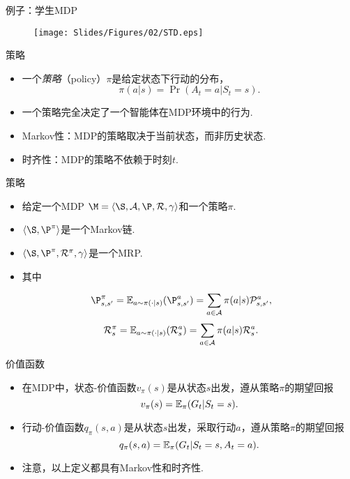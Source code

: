 \begin{frame}{例子：学生MDP}
\begin{figure}
    \centering
    \texttt{[image: Slides/Figures/02/STD.eps]}
\end{figure}
\end{frame}

\begin{frame}{策略}
\begin{itemize}
    \item     一个\emph{策略}（policy）$\pi$是给定状态下行动的分布，
    \[\pi(a|s) = \Pr(A_t=a | S_t = s).\]
    \item 一个策略完全决定了一个智能体在MDP环境中的行为.
    \item Markov性：MDP的策略取决于当前状态，而非历史状态.
    \item 时齐性：MDP的策略不依赖于时刻$t$.
\end{itemize}
\end{frame}

\begin{frame}{策略}
\begin{itemize}
    \item 给定一个MDP $\M=\langle\S,\mathcal A,\P,\mathcal R, \gamma\rangle$和一个策略$\pi$.
    \item $\langle \S, \P^{\pi}\rangle$是一个Markov链.
    \item $\langle\S,\P^{\pi}, \mathcal R^{\pi}, \gamma\rangle$是一个MRP.
    \item 其中
\end{itemize}
\[\P_{s,s'}^{\pi} = \E_{a\sim\pi(\cdot|s)}(\P^a_{s,s'})=\sum_{a\in \mathcal A}\pi(a|s)\mathcal P_{s,s'}^{a},\]
    \[\mathcal R_s^{\pi} =\mathbb{E}_{a\sim\pi(\cdot|s)}(\mathcal R^a_s)=\sum_{a\in\mathcal A}\pi(a|s)\mathcal R_s^a.\]
\end{frame}

\begin{frame}{价值函数}
\begin{itemize}
    \item 在MDP中，状态-价值函数$v_\pi(s)$是从状态$s$出发，遵从策略$\pi$的期望回报
    \[v_\pi(s) = \mathbb{E}_\pi(G_t|S_t=s).\]
    \item     行动-价值函数$q_\pi(s,a)$是从状态$s$出发，采取行动$a$，遵从策略$\pi$的期望回报
    \[q_\pi(s,a) = \mathbb{E}_\pi(G_t|S_t=s,A_t=a).\]
    \item 注意，以上定义都具有Markov性和时齐性.
\end{itemize}
\end{frame}

